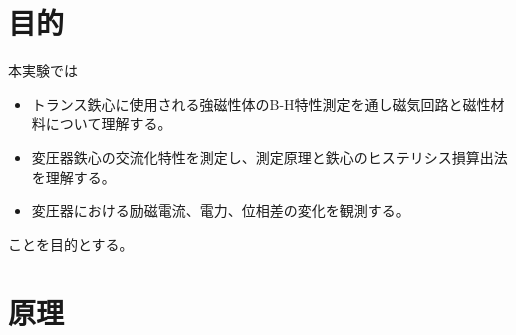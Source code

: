 \documentclass[11pt,dvipdfmx]{jarticle}
\begin{document}
\begin{jikkenTitle}
 \subTitle{} %
 \kyoudouII{} %
 \yoteibi{/ 　}%
 \yoteibiII{}%
 \yoteibiIII{}%
 \hanNumberName{}{}{} %
\end{jikkenTitle}

\section{目的}
本実験では
\begin{itemize}
	\item トランス鉄心に使用される強磁性体のB-H特性測定を通し磁気回路と磁性材料について理解する。
	\item 変圧器鉄心の交流化特性を測定し、測定原理と鉄心のヒステリシス損算出法を理解する。
	\item 変圧器における励磁電流、電力、位相差の変化を観測する。
\end{itemize}
ことを目的とする。

\section{原理}
\end{document}
